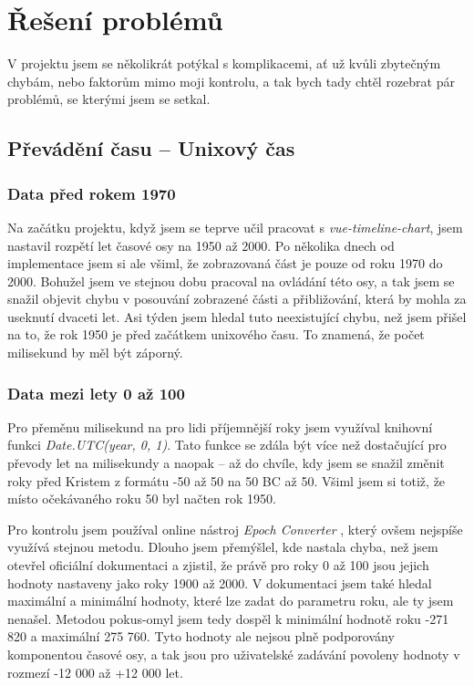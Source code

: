 \section{Řešení problémů}
V projektu jsem se několikrát potýkal s komplikacemi, ať už kvůli zbytečným chybám, nebo faktorům mimo moji kontrolu, a tak bych tady chtěl rozebrat pár problémů, se kterými jsem se setkal.

\subsection{Převádění času – Unixový čas}
\label{Převádění času - Unixový čas}

\subsubsection{Data před rokem 1970}
Na začátku projektu, když jsem se teprve učil pracovat s \textit{vue-timeline-chart}, jsem nastavil rozpětí let časové osy na 1950 až 2000. Po několika dnech od implementace jsem si ale všiml, že zobrazovaná část je pouze od roku 1970 do 2000. Bohužel jsem ve stejnou dobu pracoval na ovládání této osy, a tak jsem se snažil objevit chybu v posouvání zobrazené části a přibližování, která by mohla za useknutí dvaceti let. Asi týden jsem hledal tuto neexistující chybu, než jsem přišel na to, že rok 1950 je před začátkem unixového času. To znamená, že počet milisekund by měl být záporný.

\subsubsection{Data mezi lety 0 až 100}
Pro přeměnu milisekund na pro lidi příjemnější roky jsem využíval knihovní funkci \textit{Date.UTC(year, 0, 1)}. Tato funkce se zdála být více než dostačující pro převody let na milisekundy a naopak – až do chvíle, kdy jsem se snažil změnit roky před Kristem z formátu -50 až 50 na 50 BC až 50. Všiml jsem si totiž, že místo očekávaného roku 50 byl načten rok 1950. 

Pro kontrolu jsem používal online nástroj \textit{Epoch Converter} \cite{EpochConverter}, který ovšem nejspíše využívá stejnou metodu. Dlouho jsem přemýšlel, kde nastala chyba, než jsem otevřel oficiální dokumentaci \cite{Mozzila-UTC} a zjistil, že právě pro roky 0 až 100 jsou jejich hodnoty nastaveny jako roky 1900 až 2000. V dokumentaci jsem také hledal maximální a minimální hodnoty, které lze zadat do parametru roku, ale ty jsem nenašel. Metodou pokus-omyl jsem tedy dospěl k minimální hodnotě roku -271 820 a maximální 275 760. Tyto hodnoty ale nejsou plně podporovány komponentou časové osy, a tak jsou pro uživatelské zadávání povoleny hodnoty v rozmezí -12 000 až +12 000 let. 

